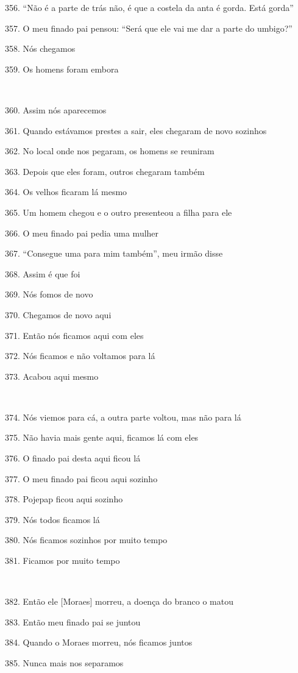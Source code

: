 356. ``Não é a parte de trás não, é que a costela da anta é gorda. Está gorda''

357. O meu finado pai pensou: ``Será que ele vai me dar a parte do umbigo?''

358. Nós chegamos

359. Os homens foram embora

~

360. Assim nós aparecemos

361. Quando estávamos prestes a sair, eles chegaram de novo sozinhos

362. No local onde nos pegaram, os homens se reuniram

363. Depois que eles foram, outros chegaram também

364. Os velhos ficaram lá mesmo

365. Um homem chegou e o outro presenteou a filha para ele

366. O meu finado pai pedia uma mulher

367. ``Consegue uma para mim também'', meu irmão disse

368. Assim é que foi

369. Nós fomos de novo

370. Chegamos de novo aqui

371. Então nós ficamos aqui com eles

372. Nós ficamos e não voltamos para lá

373. Acabou aqui mesmo

~

374. Nós viemos para cá, a outra parte voltou, mas não para lá

375. Não havia mais gente aqui, ficamos lá com eles

376. O finado pai desta aqui ficou lá

377. O meu finado pai ficou aqui sozinho

378. Pojepap ficou aqui sozinho

379. Nós todos ficamos lá

380. Nós ficamos sozinhos por muito tempo

381. Ficamos por muito tempo

~

382. Então ele {[}Moraes{]} morreu, a doença do branco o matou

383. Então meu finado pai se juntou

384. Quando o Moraes morreu, nós ficamos juntos

385. Nunca mais nos separamos

